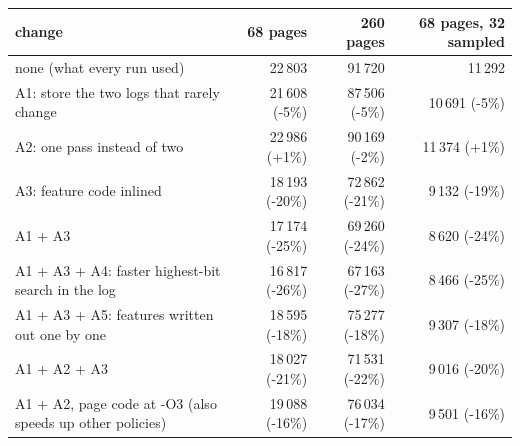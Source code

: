 \begin{tabular}{lrrr}
\toprule
change & 68 pages & 260 pages & 68 pages, 32 sampled \\
\midrule
none (what every run used) & 22\,803 & 91\,720 & 11\,292 \\
A1: store the two logs that rarely change & 21\,608 (-5\%) & 87\,506 (-5\%) & 10\,691 (-5\%) \\
A2: one pass instead of two & 22\,986 (+1\%) & 90\,169 (-2\%) & 11\,374 (+1\%) \\
A3: feature code inlined & 18\,193 (-20\%) & 72\,862 (-21\%) & 9\,132 (-19\%) \\
A1 + A3 & 17\,174 (-25\%) & 69\,260 (-24\%) & 8\,620 (-24\%) \\
A1 + A3 + A4: faster highest-bit search in the log & 16\,817 (-26\%) & 67\,163 (-27\%) & 8\,466 (-25\%) \\
A1 + A3 + A5: features written out one by one & 18\,595 (-18\%) & 75\,277 (-18\%) & 9\,307 (-18\%) \\
A1 + A2 + A3 & 18\,027 (-21\%) & 71\,531 (-22\%) & 9\,016 (-20\%) \\
A1 + A2, page code at -O3 (also speeds up other policies) & 19\,088 (-16\%) & 76\,034 (-17\%) & 9\,501 (-16\%) \\
\bottomrule
\end{tabular}
